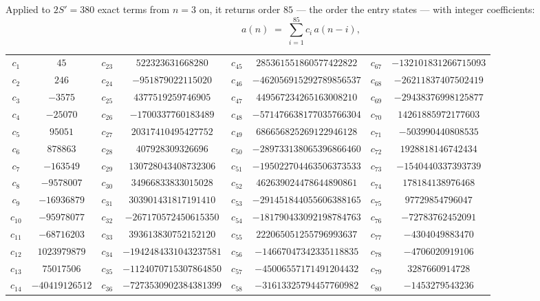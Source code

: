 \documentclass[11pt,a4paper]{article}
\theoremstyle{plain}
\theoremstyle{definition}
\begin{document}
Applied to $2S'=380$ exact terms from $n=3$ on, it returns order $85$ --- the
order the entry states --- with integer coefficients:
\[
a(n)\;=\;\sum_{i=1}^{85}c_i\,a(n-i),
\]
\begin{center}\small
\begin{tabular}{cccccccc}
$c_{1}$ & $45$ & $c_{23}$ & $522323631668280$ & $c_{45}$ & $285361551860577422822$ & $c_{67}$ & $-132101831266715093$ \\
$c_{2}$ & $246$ & $c_{24}$ & $-951879022115020$ & $c_{46}$ & $-462056915292789856537$ & $c_{68}$ & $-26211837407502419$ \\
$c_{3}$ & $-3575$ & $c_{25}$ & $4377519259746905$ & $c_{47}$ & $449567234265163008210$ & $c_{69}$ & $-29438376998125877$ \\
$c_{4}$ & $-25070$ & $c_{26}$ & $-1700337760183489$ & $c_{48}$ & $-571476638177035766304$ & $c_{70}$ & $14261885972177603$ \\
$c_{5}$ & $95051$ & $c_{27}$ & $20317410495427752$ & $c_{49}$ & $686656825269122946128$ & $c_{71}$ & $-503990440808535$ \\
$c_{6}$ & $878863$ & $c_{28}$ & $407928309326696$ & $c_{50}$ & $-289733138065396866460$ & $c_{72}$ & $1928818146742434$ \\
$c_{7}$ & $-163549$ & $c_{29}$ & $130728043408732306$ & $c_{51}$ & $-195022704463506373533$ & $c_{73}$ & $-1540440337393739$ \\
$c_{8}$ & $-9578007$ & $c_{30}$ & $34966833833015028$ & $c_{52}$ & $462639024478644890861$ & $c_{74}$ & $178184138976468$ \\
$c_{9}$ & $-16936879$ & $c_{31}$ & $303901431817191410$ & $c_{53}$ & $-291451844055606388165$ & $c_{75}$ & $97729854796047$ \\
$c_{10}$ & $-95978077$ & $c_{32}$ & $-267170572450615350$ & $c_{54}$ & $-181790433092198784763$ & $c_{76}$ & $-72783762452091$ \\
$c_{11}$ & $-68716203$ & $c_{33}$ & $393613830752152120$ & $c_{55}$ & $222065051255796993637$ & $c_{77}$ & $-4304049883470$ \\
$c_{12}$ & $1023979879$ & $c_{34}$ & $-1942484331043237581$ & $c_{56}$ & $-14667047342335118835$ & $c_{78}$ & $-4706020919106$ \\
$c_{13}$ & $75017506$ & $c_{35}$ & $-1124070715307864850$ & $c_{57}$ & $-45006557171491204432$ & $c_{79}$ & $3287660914728$ \\
$c_{14}$ & $-40419126512$ & $c_{36}$ & $-7273530902384381399$ & $c_{58}$ & $-31613325794457760982$ & $c_{80}$ & $-1453279543236$ \\

\end{tabular}
\end{center}
\end{document}
